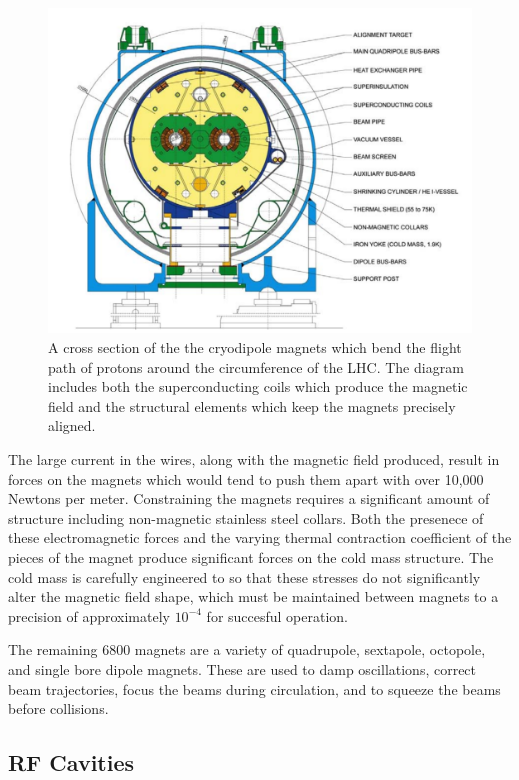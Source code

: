 \begin{figure}
\centering
\includegraphics[width=\fullfig]{figures/dipole_magnet.png}
\caption{A cross section of the the cryodipole magnets which bend the flight path of protons around the circumference of the \ac{LHC}. The diagram includes both the superconducting coils which produce the magnetic field and the structural elements which keep the magnets precisely aligned.}
\label{fig:dipole_magnet}

\end{figure}

The large current in the wires, along with the magnetic field produced, result in forces on the magnets which would tend to push them apart with over 10,000 Newtons per meter.
Constraining the magnets requires a significant amount of structure including non-magnetic stainless steel collars. 
Both the presenece of these electromagnetic forces and the varying thermal contraction coefficient of the pieces of the magnet produce significant forces on the cold mass structure. 
The cold mass is carefully engineered to so that these stresses do not significantly alter the magnetic field shape, which must be maintained between magnets to a precision of approximately $10^{-4}$ for succesful operation.

The remaining 6800 magnets are a variety of quadrupole, sextapole, octopole, and single bore dipole magnets.
These are used to damp oscillations, correct beam trajectories, focus the beams during circulation, and to squeeze the beams before collisions.

\subsection{\acs{RF} Cavities}
\label{sec:rfcavity}


